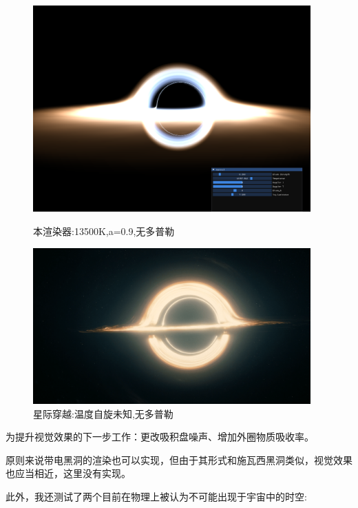\documentclass[a4paper, 12pt]{article}
\begin{document}
    \begin{figure}[H]
        \centering
        \begin{minipage}[t]{0.48\textwidth}
            \centering
            \includegraphics[width=0.95\textwidth]{photo/20k_2_ND.png}
            \caption{本渲染器:13500K,a=0.9,无多普勒}
        \end{minipage}
        \hfill
        \begin{minipage}[t]{0.48\textwidth}
            \centering
            \includegraphics[width=0.95\textwidth]{photo/S.png}
            \caption{星际穿越:温度自旋未知,无多普勒}
        \end{minipage}
    \end{figure}
    为提升视觉效果的下一步工作：更改吸积盘噪声、增加外圈物质吸收率。\par
    原则来说带电黑洞的渲染也可以实现，但由于其形式和施瓦西黑洞类似，视觉效果也应当相近，这里没有实现。\par
    此外，我还测试了两个目前在物理上被认为不可能出现于宇宙中的时空:\par
\end{document}
